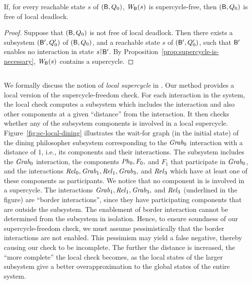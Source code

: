 \begin{corollary}
\label{cor:static:dead-free}
If, for every reachable state $s$ of $(\mathsf{B},Q_0)$, $\mathit{W}_{\mathsf{B}}({s})$ is supercycle-free, then
$(\mathsf{B},Q_0)$ is free of local deadlock.
\end{corollary}
%
\begin{proof}
Suppose that $(\mathsf{B}, Q_0)$ is not free of local deadlock. Then there exists a subsystem $(\mathsf{B}', Q'_0)$ of $(\mathsf{B}, Q_0)$, and
a reachable state $s$ of $(\mathsf{B}', Q'_0)$, such that $\mathsf{B}'$ enables no interaction in state  $s \pj \B'$.
By Proposition~\ref{prop:supercycle-is-necessary}, $\mathit{W}_{\mathsf{B}}({s})$ contains a supercycle.
\end{proof}




\subsection{}
%
We formally discuss the notion of \emph{local supercycle} in .  Our method provides a local version of the supercycle-freedom check.
For each interaction in the system, the local check computes a subsystem which includes the interaction and also other components at a given ``distance''
from the interaction.  It then checks whether any of the subsystem components is involved in a local supercycle.
%
Figure~\ref{fig:sc-local-dining} illustrates the wait-for graph (in the initial state) of the dining philosopher subsystem corresponding to the
$\mathit{Grab}_0$ interaction with a distance of $1$, i.e., its components and their interactions.  The subsystem includes the $\mathit{Grab}_0$ interaction,
the components $\mathit{Ph}_0, F_0,$ and $F_1$ that participate in $\mathit{Grab}_0$, and the interactions $\mathit{Rel}_0, \mathit{Grab}_1,\mathit{Rel}_1, \mathit{Grab}_3,$ and $\mathit{Rel}_3$ which have
at least one of these components as participants.  We notice that no component in  is involved in a supercycle.
%
The interactions  $\mathit{Grab}_1,\mathit{Rel}_1, \mathit{Grab}_3,$ and $\mathit{Rel}_3$ (underlined in the figure) are ``border interactions'', since they have participating components that are outside the subsystem.
The enablement of border interaction cannot be determined from the subsystem in isolation. Hence, to ensure soundness of our supercycle-freedom check,
we must assume pessimistically  that the border interactions are not enabled. This pessimism may yield a false negative, thereby causing our check to
be incomplete. The further the distance is increased, the ``more complete'' the local check becomes, as the local states of the larger subsystem give a
better overapproximation to the global states of the entire system.

